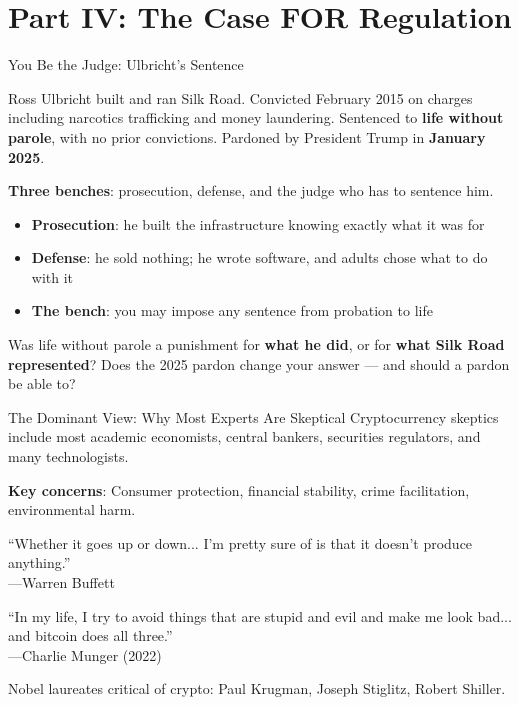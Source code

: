 ﻿\documentclass[aspectratio=169,11pt]{beamer}
\begin{document}
\section{Part IV: The Case FOR Regulation}
\begin{frame}[shrink=8]{You Be the Judge: Ulbricht's Sentence}
\begin{casestudybox}
\small
Ross Ulbricht built and ran Silk Road. Convicted February 2015 on charges including narcotics trafficking and money laundering. Sentenced to \textbf{life without parole}, with no prior convictions. Pardoned by President Trump in \textbf{January 2025}.
\end{casestudybox}

\textbf{Three benches}: prosecution, defense, and the judge who has to sentence him.
\begin{itemize}
    \item \textbf{Prosecution}: he built the infrastructure knowing exactly what it was for
    \item \textbf{Defense}: he sold nothing; he wrote software, and adults chose what to do with it
    \item \textbf{The bench}: you may impose any sentence from probation to life
\end{itemize}

\begin{discussionbox}
Was life without parole a punishment for \textbf{what he did}, or for \textbf{what Silk Road represented}? Does the 2025 pardon change your answer --- and should a pardon be able to?
\end{discussionbox}
\end{frame}


\begin{frame}{The Dominant View: Why Most Experts Are Skeptical}
Cryptocurrency skeptics include most academic economists, central bankers, securities regulators, and many technologists.

\vspace{0.3em}
\textbf{Key concerns}: Consumer protection, financial stability, crime facilitation, environmental harm.

\begin{quotebox}
``Whether it goes up or down... I'm pretty sure of is that it doesn't produce anything.''\\
\hfill---Warren Buffett
\end{quotebox}

\begin{quotebox}
``In my life, I try to avoid things that are stupid and evil and make me look bad... and bitcoin does all three.''\\
\hfill---Charlie Munger (2022)
\end{quotebox}

Nobel laureates critical of crypto: Paul Krugman, Joseph Stiglitz, Robert Shiller.
\end{frame}
\end{document}
